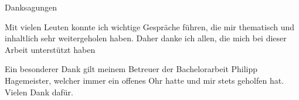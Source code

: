 \begin{center} 
	\huge Danksagungen
\end{center}
Mit vielen Leuten konnte ich wichtige Gespräche führen, die mir thematisch und inhaltlich sehr weitergeholen haben. Daher danke ich allen, die mich bei dieser Arbeit unterstützt haben\par
Ein besonderer Dank gilt meinem Betreuer der Bachelorarbeit Philipp Hagemeister, welcher immer ein offenes Ohr hatte und mir stets geholfen hat. Vielen Dank dafür.